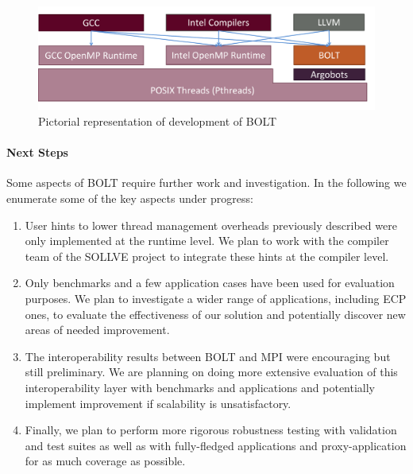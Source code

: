 \begin{figure}[htb]
  \centering
  \vspace{2.0ex}
  \includegraphics[width=0.9\columnwidth]{projects/2.3.1-PMR/2.3.1.13-SOLLVE/SOLLVE-BOLT.pdf}
  \caption{\label{fig:sollve-bolt}Pictorial representation of development of BOLT}
  \vspace{2.0ex}
\end{figure}

\paragraph{Next Steps}

Some aspects of BOLT require further work and investigation.  In the
following we enumerate some of the key aspects under progress:

\begin{enumerate}

\item User hints to lower thread management overheads previously
  described were only implemented at the runtime level.  We plan to
  work with the compiler team of the SOLLVE project to integrate these
  hints at the compiler level.

\item Only benchmarks and a few application cases have been used for
  evaluation purposes.  We plan to investigate a wider range of
  applications, including ECP ones, to evaluate the effectiveness of
  our solution and potentially discover new areas of needed
  improvement.

\item The interoperability results between BOLT and MPI were
  encouraging but still preliminary.  We are planning on doing more
  extensive evaluation of this interoperability layer with benchmarks
  and applications and potentially implement improvement if
  scalability is unsatisfactory.

\item Finally, we plan to perform more rigorous robustness testing
  with validation and test suites as well as with fully-fledged
  applications and proxy-application for as much coverage as possible.

\end{enumerate}
